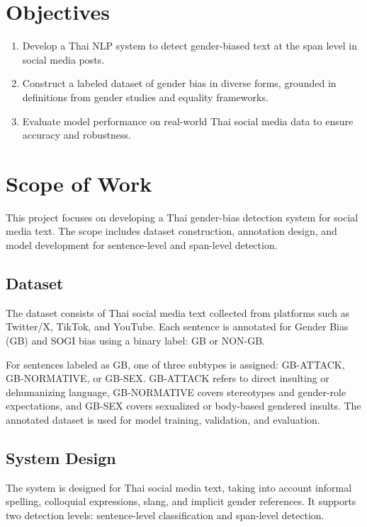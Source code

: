 \documentclass[12pt,oneside,openright,a4paper]{cpe-english-project}
\begin{document}
\section{Objectives}

\begin{enumerate}
\item
  {Develop a Thai NLP system to detect gender-biased text at the span level in social media posts.}
\item
  {Construct a labeled dataset of gender bias in diverse forms, grounded in definitions from gender studies and equality frameworks.}
\item
  {Evaluate model performance on real-world Thai social media data to ensure accuracy and robustness.}
\end{enumerate}



\section{Scope of Work}

This project focuses on developing a Thai gender-bias detection system for social media text. The scope includes dataset construction, annotation design, and model development for sentence-level and span-level detection.

\subsection{Dataset}

The dataset consists of Thai social media text collected from platforms such as Twitter/X, TikTok, and YouTube. Each sentence is annotated for Gender Bias (GB) and SOGI bias using a binary label: GB or NON-GB.

For sentences labeled as GB, one of three subtypes is assigned: GB-ATTACK, GB-NORMATIVE, or GB-SEX. GB-ATTACK refers to direct insulting or dehumanizing language, GB-NORMATIVE covers stereotypes and gender-role expectations, and GB-SEX covers sexualized or body-based gendered insults. The annotated dataset is used for model training, validation, and evaluation.

\subsection{System Design}

The system is designed for Thai social media text, taking into account informal spelling, colloquial expressions, slang, and implicit gender references. It supports two detection levels: sentence-level classification and span-level detection.
\end{document}
